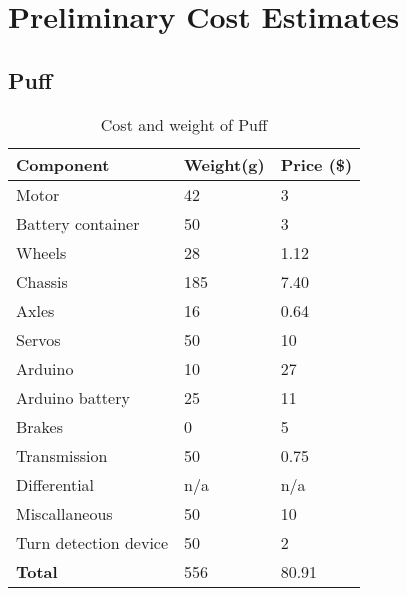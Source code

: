 \documentclass[class=../../report, crop=false]{standalone}
\newcommand{\weight}[1]{
	\cellcolor{blue!10}#1
}
\newcommand{\cost}[1]{
	\cellcolor{green!10}#1
}
\newcommand{\total}[1]{
	\cellcolor{green!25}#1
}
\begin{document}
\section{Preliminary Cost Estimates} \label{app:costestimates}

\subsection{Puff}
\begin{table}[H]
	\centering
	\begin{tabular}{| l | l | l|}
		\hline
		\textbf{Component} & \textbf{Weight(g)} & \textbf{Price (\$)}\\ \hline
		Motor					& \weight{42}	& \cost{3}		\\ \hline
		Battery container		& \weight{50}	& \cost{3}		\\ \hline
		Wheels					& \weight{28}	& \cost{1.12}	\\ \hline
		Chassis					& \weight{185}	& \cost{7.40}	\\ \hline
		Axles					& \weight{16}	& \cost{0.64}	\\ \hline
		Servos					& \weight{50}	& \cost{10}		\\ \hline
		Arduino					& \weight{10}	& \cost{27}		\\ \hline
		Arduino battery			& \weight{25}	& \cost{11}		\\ \hline
		Brakes					& \weight{0}	& \cost{5}		\\ \hline
		Transmission			& \weight{50}	& \cost{0.75}	\\ \hline
		Differential			& \weight{n/a}	& \cost{n/a}	\\ \hline
		Miscallaneous			& \weight{50}	& \cost{10}		\\ \hline
		Turn detection device	& \weight{50}	& \cost{2}		\\ \hline
		\total{\textbf{Total}} 	& \total{556}	& \total{80.91}	\\ \hline
	\end{tabular}
	\caption{Cost and weight of Puff}
\end{table}
\end{document}
